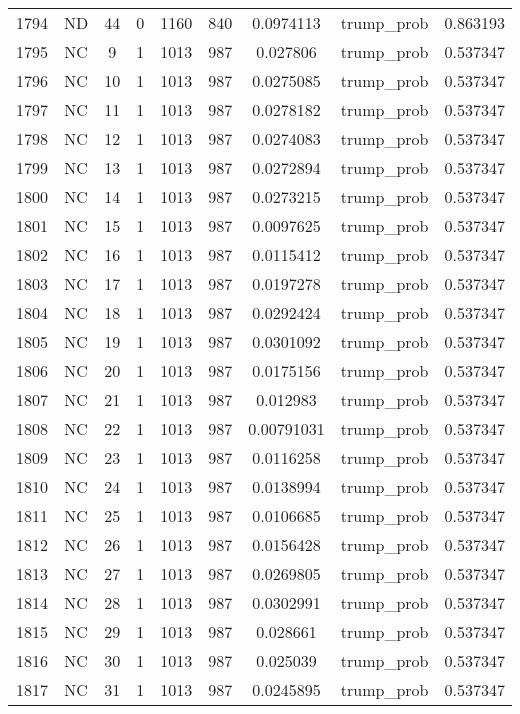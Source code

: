 \documentclass[12pt,a4paper]{article}
\begin{document}
\begin{tabular}{r|cccccccc}
	1794 & ND & 44 & 0 & 1160 & 840 & 0.0974113 & trump\_prob & 0.863193 \\
	1795 & NC & 9 & 1 & 1013 & 987 & 0.027806 & trump\_prob & 0.537347 \\
	1796 & NC & 10 & 1 & 1013 & 987 & 0.0275085 & trump\_prob & 0.537347 \\
	1797 & NC & 11 & 1 & 1013 & 987 & 0.0278182 & trump\_prob & 0.537347 \\
	1798 & NC & 12 & 1 & 1013 & 987 & 0.0274083 & trump\_prob & 0.537347 \\
	1799 & NC & 13 & 1 & 1013 & 987 & 0.0272894 & trump\_prob & 0.537347 \\
	1800 & NC & 14 & 1 & 1013 & 987 & 0.0273215 & trump\_prob & 0.537347 \\
	1801 & NC & 15 & 1 & 1013 & 987 & 0.0097625 & trump\_prob & 0.537347 \\
	1802 & NC & 16 & 1 & 1013 & 987 & 0.0115412 & trump\_prob & 0.537347 \\
	1803 & NC & 17 & 1 & 1013 & 987 & 0.0197278 & trump\_prob & 0.537347 \\
	1804 & NC & 18 & 1 & 1013 & 987 & 0.0292424 & trump\_prob & 0.537347 \\
	1805 & NC & 19 & 1 & 1013 & 987 & 0.0301092 & trump\_prob & 0.537347 \\
	1806 & NC & 20 & 1 & 1013 & 987 & 0.0175156 & trump\_prob & 0.537347 \\
	1807 & NC & 21 & 1 & 1013 & 987 & 0.012983 & trump\_prob & 0.537347 \\
	1808 & NC & 22 & 1 & 1013 & 987 & 0.00791031 & trump\_prob & 0.537347 \\
	1809 & NC & 23 & 1 & 1013 & 987 & 0.0116258 & trump\_prob & 0.537347 \\
	1810 & NC & 24 & 1 & 1013 & 987 & 0.0138994 & trump\_prob & 0.537347 \\
	1811 & NC & 25 & 1 & 1013 & 987 & 0.0106685 & trump\_prob & 0.537347 \\
	1812 & NC & 26 & 1 & 1013 & 987 & 0.0156428 & trump\_prob & 0.537347 \\
	1813 & NC & 27 & 1 & 1013 & 987 & 0.0269805 & trump\_prob & 0.537347 \\
	1814 & NC & 28 & 1 & 1013 & 987 & 0.0302991 & trump\_prob & 0.537347 \\
	1815 & NC & 29 & 1 & 1013 & 987 & 0.028661 & trump\_prob & 0.537347 \\
	1816 & NC & 30 & 1 & 1013 & 987 & 0.025039 & trump\_prob & 0.537347 \\
	1817 & NC & 31 & 1 & 1013 & 987 & 0.0245895 & trump\_prob & 0.537347 \\

\end{tabular}
\end{document}

